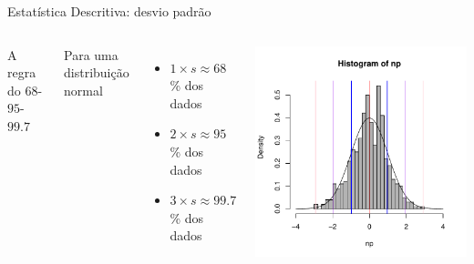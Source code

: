 \documentclass{beamer}\usepackage[]{graphicx}\usepackage[]{color}
\newenvironment{knitrout}{}{} %
\renewenvironment{knitrout}{\setlength{\topsep}{0mm}}{}
\begin{document}
\begin{frame}{Estatística Descritiva: desvio padrão}

\begin{columns}[c]


A regra do $68$-$95$-$99.7$

Para uma distribuição normal

\begin{itemize}

  \item $1 \times s \approx 68$ \% dos dados
  \item $2 \times s \approx 95$ \% dos dados
  \item $3 \times s \approx 99.7$ \% dos dados

\end{itemize}
\centering
\begin{knitrout}
\color{fgcolor}
\includegraphics[width=1.1\linewidth]{figure/unnamed-chunk-7-1} 

\end{knitrout}

\end{columns}


\end{frame} 
\end{document}
